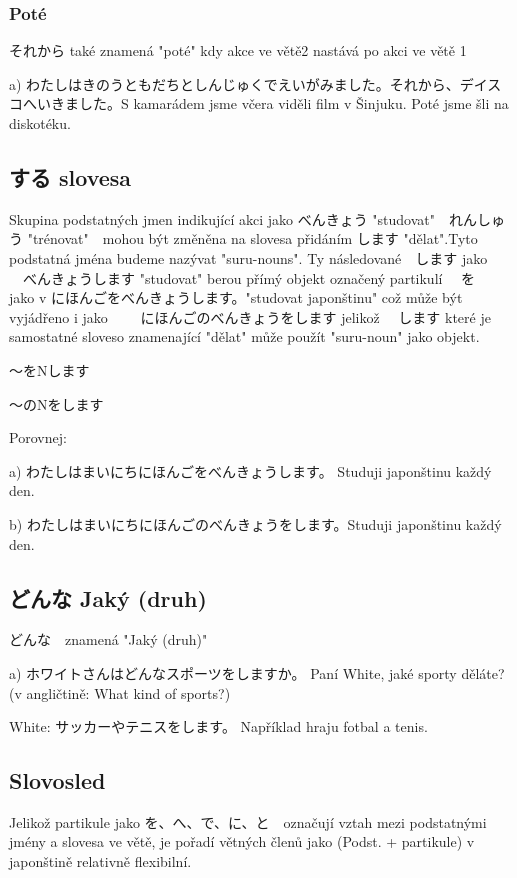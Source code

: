 \subsubsection{Poté}
それから také znamená "poté" kdy akce ve větě2 nastává po akci ve větě 1

a) わたしはきのうともだちとしんじゅくでえいがみました。それから、デイスコへいきました。S kamarádem jsme včera viděli film v Šinjuku. Poté jsme šli na diskotéku.

\subsection{する slovesa}

Skupina podstatných jmen indikující akci jako べんきょう "studovat"　れんしゅう "trénovat"　mohou být změněna na slovesa přidáním します "dělat".Tyto podstatná jména budeme nazývat "suru-nouns". Ty následované　します jako 　べんきょうします "studovat" berou přímý objekt označený partikulí  　を　 jako v にほんごをべんきょうします。"studovat japonštinu" což může být vyjádřeno i jako 　　にほんごのべんきょうをします jelikož 　します které je samostatné sloveso znamenající "dělat" může použít "suru-noun" jako objekt.

〜をNします　	 

〜のNをします

Porovnej: 

a) わたしはまいにちにほんごをべんきょうします。 Studuji japonštinu každý den.

b) わたしはまいにちにほんごのべんきょうをします。Studuji japonštinu každý den.


\subsection{どんな Jaký (druh)}

どんな　znamená "Jaký (druh)" 

a)  ホワイトさんはどんなスポーツをしますか。	Paní White, jaké sporty děláte? (v angličtině: What kind of sports?)

White: サッカーやテニスをします。 Například hraju fotbal a tenis. 


\subsection{Slovosled}

Jelikož partikule jako を、へ、で、に、と　označují vztah mezi podstatnými jmény a slovesa ve větě, je pořadí větných členů jako (Podst. + partikule) v japonštině relativně flexibilní. 


